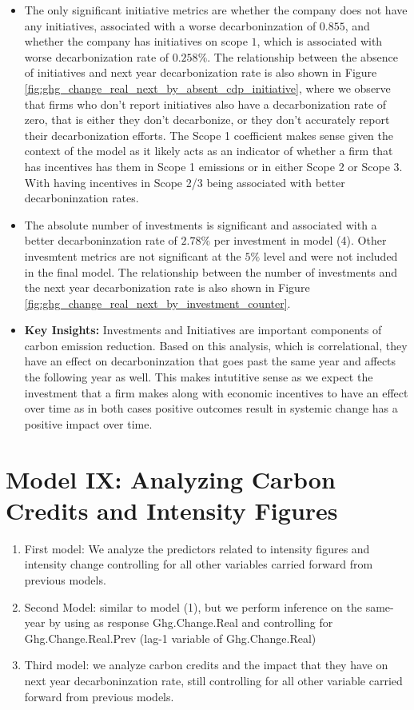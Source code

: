 \begin{itemize}
    \item The only significant initiative metrics are whether the company does not have any initiatives, associated with a worse decarboninzation of $0.855$, and whether the company has initiatives on scope $1$, which is associated with worse decarbonization rate of $0.258\%$. The relationship between the absence of initiatives and next year decarbonization rate is also shown in Figure \ref{fig:ghg_change_real_next_by_absent_cdp_initiative}, where we observe that firms who don't report initiatives also have a decarbonization rate of zero, that is either they don't decarbonize, or they don't accurately report their decarbonization efforts. The Scope 1 coefficient makes sense given the context of the model as it likely acts as an indicator of whether a firm that has incentives has them in Scope 1 emissions or in either Scope 2 or Scope 3. With having incentives in Scope 2/3 being associated with better decarboninzation rates. 
    \item The absolute number of investments is significant and associated with a better decarboninzation rate of $2.78\%$ per investment in model (4). Other invesmtent metrics are not significant at the $5\%$ level and were not included in the final model. The relationship between the number of investments and the next year decarbonization rate is also shown in Figure \ref{fig:ghg_change_real_next_by_investment_counter}.
    \item \textbf{Key Insights:} Investments and Initiatives are important components of carbon emission reduction. Based on this analysis, which is correlational, they have an effect on decarboninzation that goes past the same year and affects the following year as well. This makes intutitive sense as we expect the investment that a firm makes along with economic incentives to have an effect over time as in both cases positive outcomes result in systemic change has a positive impact over time.
\end{itemize}

\section{Model IX: Analyzing Carbon Credits and Intensity Figures}

\begin{enumerate}
    \item First model: We analyze the predictors related to intensity figures and intensity change controlling for all other variables carried forward from previous models.
    \item Second Model: similar to model (1), but we perform inference on the same-year by using as response Ghg.Change.Real and controlling for Ghg.Change.Real.Prev (lag-1 variable of Ghg.Change.Real)
    \item Third model: we analyze carbon credits and the impact that they have on next year decarboninzation rate, still controlling for all other variable carried forward from previous models.
\end{enumerate}

